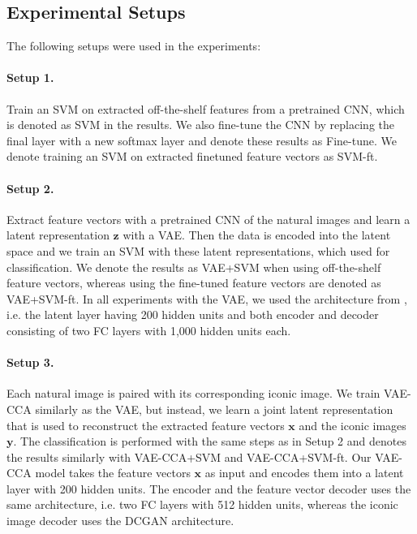 \subsection{Experimental Setups}\label{subsec:experimental-setups}

The following setups were used in the experiments: 

\vspace{-3mm}
\paragraph{Setup 1.} Train an SVM on extracted off-the-shelf features from a pretrained CNN, which is denoted as SVM in the results. We also fine-tune the CNN by replacing the final layer with a new softmax layer and denote these results as Fine-tune. We denote training an SVM on extracted finetuned feature vectors as SVM-ft.

\vspace{-3mm}
\paragraph{Setup 2.} Extract feature vectors with a pretrained CNN of the natural images and learn a latent representation $\mathbf{z}$ with a VAE. Then the data is encoded into the latent space and we train an SVM with these latent representations, which used for classification. We denote the results as VAE+SVM when using off-the-shelf feature vectors, whereas using the fine-tuned feature vectors are denoted as VAE+SVM-ft. In all experiments with the VAE, we used the architecture from , i.e. the latent layer having 200 hidden units and both encoder and decoder consisting of two FC layers with 1,000 hidden units each.

\vspace{-3mm}
\paragraph{Setup 3.} Each natural image is paired with its corresponding iconic image. We train VAE-CCA similarly as the VAE, but instead, we learn a joint latent representation that is used to reconstruct the extracted feature vectors $\mathbf{x}$ and the iconic images $\mathbf{y}$. The classification is performed with the same steps as in Setup 2 and denotes the results similarly with VAE-CCA+SVM and VAE-CCA+SVM-ft. Our VAE-CCA model takes the feature vectors $\mathbf{x}$ as input and encodes them into a latent layer with 200 hidden units. The encoder and the feature vector decoder uses the same architecture, i.e. two FC layers with 512 hidden units, whereas the iconic image decoder uses the DCGAN  architecture.

